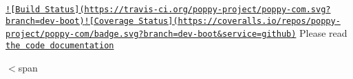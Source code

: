 \href{https://travis-ci.org/poppy-project/poppy-com}{\tt !\mbox{[}Build Status\mbox{]}(https\-://travis-\/ci.\-org/poppy-\/project/poppy-\/com.\-svg?branch=dev-\/boot)}\href{https://coveralls.io/github/poppy-project/poppy-com?branch=dev-boot}{\tt !\mbox{[}Coverage Status\mbox{]}(https\-://coveralls.\-io/repos/poppy-\/project/poppy-\/com/badge.\-svg?branch=dev-\/boot\&service=github)} Please read \href{http://poppy-project.github.io/poppy-com/}{\tt the code documentation}

$<$span 
